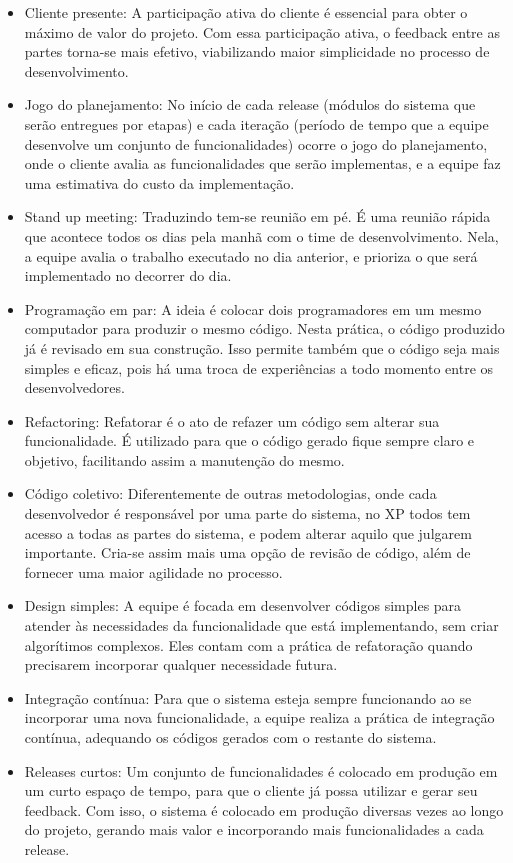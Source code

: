 \documentclass[quali]{ppgccufscar}
\begin{document}
\begin{itemize}
	\item Cliente presente: A participação ativa do cliente é essencial para obter o máximo de valor do projeto. Com essa participação ativa, o feedback entre as partes torna-se mais efetivo, viabilizando maior simplicidade no processo de desenvolvimento.
	\item Jogo do planejamento: No início de cada release (módulos do sistema que serão entregues por etapas) e cada iteração (período de tempo que a equipe desenvolve um conjunto de funcionalidades) ocorre o jogo do planejamento, onde o cliente avalia as funcionalidades que serão implementas, e a equipe faz uma estimativa do custo da implementação.
	\item Stand up meeting: Traduzindo tem-se reunião em pé. É uma reunião rápida que acontece todos os dias pela manhã com o time de desenvolvimento. Nela, a equipe avalia o trabalho executado no dia anterior, e prioriza o que será implementado no decorrer do dia.
	\item Programação em par: A ideia é colocar dois programadores em um mesmo computador para produzir o mesmo código. Nesta prática, o código produzido já é revisado em sua construção. Isso permite também que o código seja mais simples e eficaz, pois há uma troca de experiências a todo momento entre os desenvolvedores.
	\item Refactoring: Refatorar é o ato de refazer um código sem alterar sua funcionalidade. É utilizado para que o código gerado fique sempre claro e objetivo, facilitando assim a manutenção do mesmo.
	\item Código coletivo: Diferentemente de outras metodologias, onde cada desenvolvedor é responsável por uma parte do sistema, no XP todos tem acesso a todas as partes do sistema, e podem alterar aquilo que julgarem importante. Cria-se assim mais uma opção de revisão de código, além de fornecer uma maior agilidade no processo.
	\item Design simples: A equipe é focada em desenvolver códigos simples para atender às necessidades da funcionalidade que está implementando, sem criar algorítimos complexos. Eles contam com a prática de refatoração quando precisarem incorporar qualquer necessidade futura.
	\item Integração contínua: Para que o sistema esteja sempre funcionando ao se incorporar uma nova funcionalidade, a equipe realiza a prática de integração contínua, adequando os códigos gerados com o restante do sistema.
	\item Releases curtos: Um conjunto de funcionalidades é colocado em produção em um curto espaço de tempo, para que o cliente já possa utilizar e gerar seu feedback. Com isso, o sistema é colocado em produção diversas vezes ao longo do projeto, gerando mais valor e incorporando mais funcionalidades a cada release.
\end{itemize}
\end{document}
